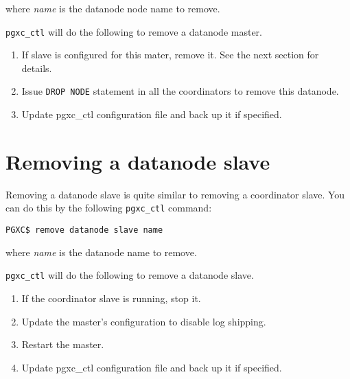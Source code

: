   where {\it name} is the datanode node name to remove.
  
  \verb|pgxc_ctl| will do the following to remove a datanode master.
  
  \begin{enumerate}
	  \item If slave is configured for this mater, remove it.
	  		See the next section for details.
	  \item Issue \verb|DROP NODE| statement in all the coordinators to remove this datanode.
	  \item Update pgxc\_ctl configuration file and back up it if specified.
  \end{enumerate}



\section{Removing a datanode slave}

  Removing a datanode slave is quite similar to removing a coordinator slave.
  You can do this by the following \verb|pgxc_ctl| command:
  
  \begin{lstlisting}[frame=single]
PGXC$ remove datanode slave name
  \end{lstlisting}
  
  where {\it name} is the datanode name to remove.
  
  \verb|pgxc_ctl| will do the following to remove a datanode slave.
  
  \begin{enumerate}
	  \item If the coordinator slave is running, stop it.
	  \item Update the master's configuration to disable log shipping.
	  \item Restart the master.
	  \item Update pgxc\_ctl configuration file and back up it if specified.
  \end{enumerate}

